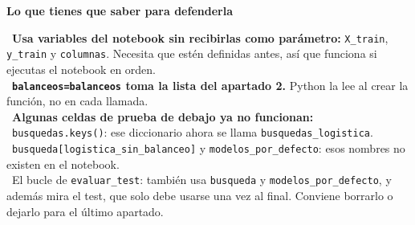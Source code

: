 \documentclass[11pt,a4paper]{article}
\begin{document}
{\smallskip\noindent\textbf{Lo que tienes que saber para defenderla}\par
\hspace*{1.0em}\textbullet~\textbf{Usa variables del notebook sin recibirlas como parámetro:} \texttt{X\_\allowbreak{}train}, \texttt{y\_\allowbreak{}train} y \texttt{columnas}. Necesita que estén definidas antes, así que funciona si ejecutas el notebook en orden. \\{}
\hspace*{1.0em}\textbullet~\textbf{\texttt{balanceos=balanceos} toma la lista del apartado 2.} Python la lee al crear la función, no en cada llamada. \\{}
\hspace*{1.0em}\textbullet~\textbf{Algunas celdas de prueba de debajo ya no funcionan:} \\{}
\hspace*{2.0em}\textbullet~\texttt{busquedas.keys()}: ese diccionario ahora se llama \texttt{busquedas\_\allowbreak{}logistica}. \\{}
\hspace*{2.0em}\textbullet~\texttt{busqueda[\textquotedbl{}logistica\_\allowbreak{}sin\_\allowbreak{}balanceo\textquotedbl{}]} y \texttt{modelos\_\allowbreak{}por\_\allowbreak{}defecto}: esos nombres no existen en el notebook. \\{}
\hspace*{2.0em}\textbullet~El bucle de \texttt{evaluar\_\allowbreak{}test}: también usa \texttt{busqueda} y \texttt{modelos\_\allowbreak{}por\_\allowbreak{}defecto}, y además mira el test, que solo debe usarse una vez al final. Conviene borrarlo o dejarlo para el último apartado.

}
\end{document}
